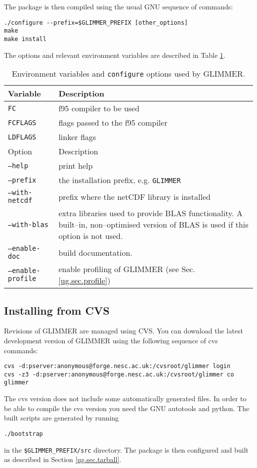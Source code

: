 The package is then compiled using the usual GNU sequence of commands:
\begin{verbatim}
./configure --prefix=$GLIMMER_PREFIX [other_options]
make
make install
\end{verbatim}
The options and relevant environment variables are described in Table \ref{ug.tab.env}. 
\begin{table}[htbp]
  \centering
  \begin{tabular}{|l|p{10cm}|}
    \hline
    Variable & Description \\
    \hline
    \texttt{FC} & f95 compiler to be used \\
    \texttt{FCFLAGS} & flags passed to the f95 compiler \\
    \texttt{LDFLAGS} & linker flags\\
    \hline
    Option  & Description \\
    \hline
    \texttt{--help} & print help \\
    \texttt{--prefix} & the installation prefix, e.g. \texttt{GLIMMER} \\
    \texttt{--with-netcdf} & prefix where the netCDF library is installed \\
    \texttt{--with-blas} & extra libraries used to provide BLAS functionality. A built--in, non--optimised version of BLAS is used if this option is not used. \\
    \texttt{--enable-doc} & build documentation.\\
    \texttt{--enable-profile} & enable profiling of GLIMMER (see Sec. \ref{ug.sec.profile})\\
    \hline
  \end{tabular}
  \caption{Environment variables and \texttt{configure} options used by GLIMMER.}
  \label{ug.tab.env}
\end{table}

\subsection{Installing from CVS}
Revisions of GLIMMER are managed using CVS. You can download the latest development version of GLIMMER using the following sequence of cvs commands:
\begin{verbatim}
cvs -d:pserver:anonymous@forge.nesc.ac.uk:/cvsroot/glimmer login
cvs -z3 -d:pserver:anonymous@forge.nesc.ac.uk:/cvsroot/glimmer co glimmer
\end{verbatim}

The cvs version does not include some automatically generated files. In order to be able to compile the cvs version you need the GNU autotools and python. The built scripts are generated by running
\begin{verbatim}
./bootstrap
\end{verbatim}
in the \texttt{\$GLIMMER\_PREFIX/src} directory. The package is then configured and built as described in Section \ref{ug.sec.tarball}.


